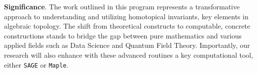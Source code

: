 \smallskip\textbf{Significance}.
The work outlined in this program represents a transformative approach to understanding and utilizing homotopical invariants, key elements in algebraic topology.
The shift from theoretical constructs to computable, concrete constructions stands to bridge the gap between pure mathematics and various applied fields such as Data Science and Quantum Field Theory.
Importantly, our research will also enhance with these advanced routines a key computational tool, either \texttt{SAGE} or \texttt{Maple}.